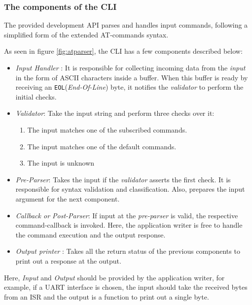 \subsubsection{The components of the CLI}
The provided development API parses and handles input commands, following a simplified form of the extended AT-commands syntax. 



As seen in figure \ref{fig:atparser}, the CLI has a few components described below:
\begin{itemize}
    \item  \textit{Input Handler} : It is responsible for collecting incoming data from the \textit{input} in the form of ASCII characters inside a buffer. When this buffer is ready by receiving an \lstinline{EOL}(\textit{End-Of-Line}) byte, it notifies the \textit{validator} to perform the initial checks.
    \item \textit{Validator}: Take the input string and perform three checks over it:
    \begin{enumerate}
        \item The input matches one of the subscribed commands.
        \item The input matches one of the default commands.
        \item The input is unknown
    \end{enumerate}
    \item \textit{Pre-Parser}: Takes the input if the \textit{validator} asserts the first check. It is responsible for syntax validation and classification. Also, prepares the input argument for the next component.
    \item \textit{Callback or Post-Parser}: If input at the \textit{pre-parser} is valid, the respective command-callback is invoked. Here, the application writer is free to handle the command execution and the output response.
    \item \textit{Output printer} : Takes all the return status of the previous components to print out a response at the output.
\end{itemize}
\bigskip

\begin{tcolorbox}
\HandRight Here, \textit{Input} and \textit{Output} should be provided by the application writer, for example, if a UART interface is chosen, the input should take the received bytes from an ISR and the output is a function to print out a single byte.
\end{tcolorbox}

